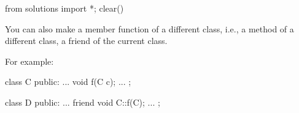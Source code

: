 \begin{python0}
from solutions import *; clear()
\end{python0}

You can also make a member function of a different class, i.e., a method
of a different class, a friend of the current class.

For example:

\begin{consolethree}[escapeinside=||]
class C
{
public:
    ...
    void f(C c);
    ...
};

class D
{
public:
    ...
    friend void C::f(C);
    ...
};
\end{consolethree}


